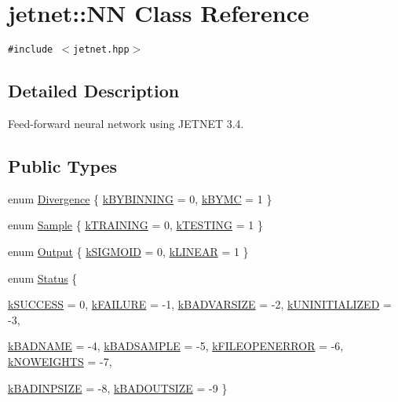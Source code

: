 \hypertarget{classjetnet_1_1NN}{
\section{jetnet::NN Class Reference}
\label{classjetnet_1_1NN}
}
{\tt \#include $<$jetnet.hpp$>$}



\subsection{Detailed Description}
Feed-forward neural network using JETNET 3.4. 

\subsection*{Public Types}
\begin{CompactItemize}
\item 
enum \hyperlink{classjetnet_1_1NN_w16}{Divergence} \{ \hyperlink{classjetnet_1_1NN_w16w0}{k\-BYBINNING} =  0, 
\hyperlink{classjetnet_1_1NN_w16w1}{k\-BYMC} =  1
 \}
\item 
enum \hyperlink{classjetnet_1_1NN_w17}{Sample} \{ \hyperlink{classjetnet_1_1NN_w17w2}{k\-TRAINING} =  0, 
\hyperlink{classjetnet_1_1NN_w17w3}{k\-TESTING} =  1
 \}
\item 
enum \hyperlink{classjetnet_1_1NN_w18}{Output} \{ \hyperlink{classjetnet_1_1NN_w18w4}{k\-SIGMOID} =  0, 
\hyperlink{classjetnet_1_1NN_w18w5}{k\-LINEAR} =  1
 \}
\item 
enum \hyperlink{classjetnet_1_1NN_w19}{Status} \{ \par
\hyperlink{classjetnet_1_1NN_w19w6}{k\-SUCCESS} =  0, 
\hyperlink{classjetnet_1_1NN_w19w7}{k\-FAILURE} = -1, 
\hyperlink{classjetnet_1_1NN_w19w8}{k\-BADVARSIZE} = -2, 
\hyperlink{classjetnet_1_1NN_w19w9}{k\-UNINITIALIZED} = -3, 
\par
\hyperlink{classjetnet_1_1NN_w19w10}{k\-BADNAME} = -4, 
\hyperlink{classjetnet_1_1NN_w19w11}{k\-BADSAMPLE} = -5, 
\hyperlink{classjetnet_1_1NN_w19w12}{k\-FILEOPENERROR} = -6, 
\hyperlink{classjetnet_1_1NN_w19w13}{k\-NOWEIGHTS} = -7, 
\par
\hyperlink{classjetnet_1_1NN_w19w14}{k\-BADINPSIZE} = -8, 
\hyperlink{classjetnet_1_1NN_w19w15}{k\-BADOUTSIZE} = -9
 \}
\end{CompactItemize}
